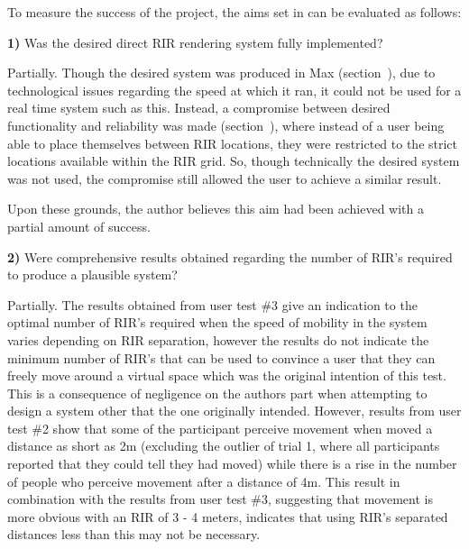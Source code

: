 \documentclass[../../main.tex]{subfiles}
\begin{document}
			To measure the success of the project, the aims set in  can be evaluated as follows:

			\textbf{1)} Was the desired direct \ac{RIR} rendering system fully implemented?

				Partially. Though the desired system was produced in Max (section~), due to technological issues regarding the speed at which it ran, it could not be used for a real time system such as this. Instead, a compromise between desired functionality and reliability was made (section~), where instead of a user being able to place themselves between \ac{RIR} locations, they were restricted to the strict locations available within the \ac{RIR} grid. So, though technically the desired system was not used, the compromise still allowed the user to achieve a similar result.

				Upon these grounds, the author believes this aim had been achieved with a partial amount of success.


			\textbf{2)} Were comprehensive results obtained regarding the number of \ac{RIR}'s required to produce a plausible system?


				Partially. The results obtained from user test \#3 give an indication to the optimal number of \ac{RIR}'s required when the speed of mobility in the system varies depending on \ac{RIR} separation, however the results do not indicate the minimum number of \ac{RIR}'s that can be used to convince a user that they can freely move around a virtual space which was the original intention of this test. This is a consequence of negligence on the authors part when attempting to design a system other that the one originally intended. However, results from user test \#2 show that some of the participant perceive movement when moved a distance as short as 2m (excluding the outlier of trial 1, where all participants reported that they could tell they had moved) while there is a rise in the number of people who perceive movement after a distance of 4m. This result in combination with the results from user test \#3, suggesting that movement is more obvious with an \ac{RIR} of 3 - 4 meters, indicates that using \ac{RIR}'s separated distances less than this may not be necessary. %

\end{document}
